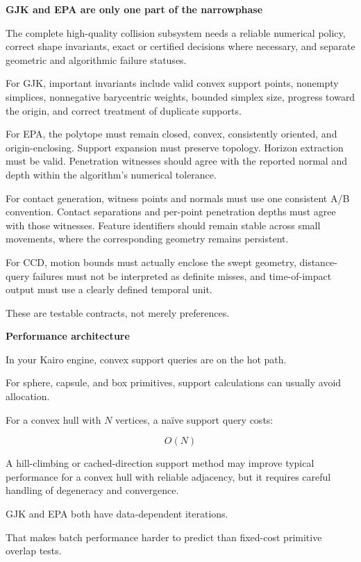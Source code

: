 \hypertarget{04-visual-computing-ii-ch026-what-full-production-readiness-requires}{}

\textbf{GJK and EPA are only one part of the narrowphase}

The complete high-quality collision subsystem needs a reliable numerical policy, correct shape invariants, exact or certified decisions where necessary, and separate geometric and algorithmic failure statuses.

For GJK, important invariants include valid convex support points, nonempty simplices, nonnegative barycentric weights, bounded simplex size, progress toward the origin, and correct treatment of duplicate supports.

For EPA, the polytope must remain closed, convex, consistently oriented, and origin-enclosing. Support expansion must preserve topology. Horizon extraction must be valid. Penetration witnesses should agree with the reported normal and depth within the algorithm's numerical tolerance.

For contact generation, witness points and normals must use one consistent A/B convention. Contact separations and per-point penetration depths must agree with those witnesses. Feature identifiers should remain stable across small movements, where the corresponding geometry remains persistent.

For CCD, motion bounds must actually enclose the swept geometry, distance-query failures must not be interpreted as definite misses, and time-of-impact output must use a clearly defined temporal unit.

These are testable contracts, not merely preferences.

\textbf{Performance architecture}

In your Kairo engine, convex support queries are on the hot path.

For sphere, capsule, and box primitives, support calculations can usually avoid allocation.

For a convex hull with \(N\) vertices, a naïve support query costs:

\[
O(N)
\]

A hill-climbing or cached-direction support method may improve typical performance for a convex hull with reliable adjacency, but it requires careful handling of degeneracy and convergence.

GJK and EPA both have data-dependent iterations.

That makes batch performance harder to predict than fixed-cost primitive overlap tests.

